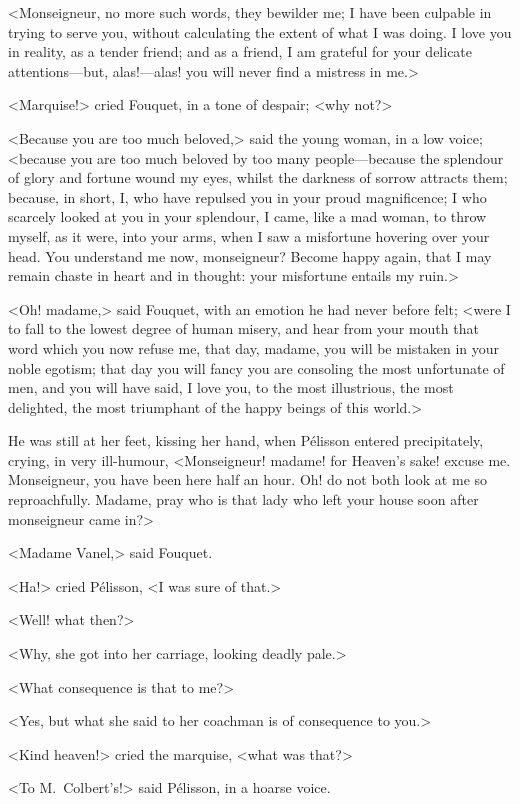 <Monseigneur, no more such words, they bewilder me; I have been culpable in trying to serve you, without calculating the extent of what I was doing. I love you in reality, as a tender friend; and as a friend, I am grateful for your delicate attentions—but, alas!—alas! you will never find a mistress in me.>

<Marquise!> cried Fouquet, in a tone of despair; <why not?>

<Because you are too much beloved,> said the young woman, in a low voice; <because you are too much beloved by too many people—because the splendour of glory and fortune wound my eyes, whilst the darkness of sorrow attracts them; because, in short, I, who have repulsed you in your proud magnificence; I who scarcely looked at you in your splendour, I came, like a mad woman, to throw myself, as it were, into your arms, when I saw a misfortune hovering over your head. You understand me now, monseigneur? Become happy again, that I may remain chaste in heart and in thought: your misfortune entails my ruin.>

<Oh! madame,> said Fouquet, with an emotion he had never before felt; <were I to fall to the lowest degree of human misery, and hear from your mouth that word which you now refuse me, that day, madame, you will be mistaken in your noble egotism; that day you will fancy you are consoling the most unfortunate of men, and you will have said, I love you, to the most illustrious, the most delighted, the most triumphant of the happy beings of this world.>

He was still at her feet, kissing her hand, when Pélisson entered precipitately, crying, in very ill-humour, <Monseigneur! madame! for Heaven's sake! excuse me. Monseigneur, you have been here half an hour. Oh! do not both look at me so reproachfully. Madame, pray who is that lady who left your house soon after monseigneur came in?>

<Madame Vanel,> said Fouquet.

<Ha!> cried Pélisson, <I was sure of that.>

<Well! what then?>

<Why, she got into her carriage, looking deadly pale.>

<What consequence is that to me?>

<Yes, but what she said to her coachman is of consequence to you.>

<Kind heaven!> cried the marquise, <what was that?>

<To M.~Colbert's!> said Pélisson, in a hoarse voice.

